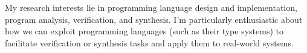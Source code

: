 \documentclass[12pt,letterpaper]{report}
\newcommand{\listitemspace}{0.15em}
\renewenvironment{itemize}
{\begin{list}{}{\setlength{\leftmargin}{0em}
			\setlength{\parskip}{0em}
			\setlength{\itemsep}{\listitemspace}
			\setlength{\parsep}{\listitemspace}}}
	{\end{list}}
\begin{document}
	\begin{itemize}



\item My research interests lie in programming language design and implementation, program analysis, verification, and synthesis. I'm particularly enthusiastic about how we can exploit programming languages (such as their type systems) to facilitate verification or synthesis tasks and apply them to real-world systems.

	\end{itemize}

\end{document}
